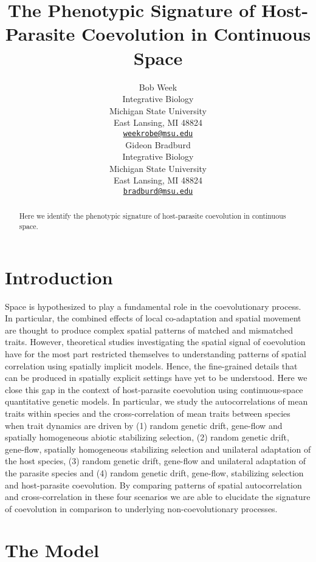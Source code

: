 \documentclass{article}
\title{The Phenotypic Signature of Host-Parasite Coevolution in Continuous
Space}
\author{
    Bob Week
   \\
    Integrative Biology \\
    Michigan State University \\
  East Lansing, MI 48824 \\
  \texttt{\href{mailto:weekrobe@msu.edu}{\nolinkurl{weekrobe@msu.edu}}} \\
   \And
    Gideon Bradburd
   \\
    Integrative Biology \\
    Michigan State University \\
  East Lansing, MI 48824 \\
  \texttt{\href{mailto:bradburd@msu.edu}{\nolinkurl{bradburd@msu.edu}}} \\
  }
\begin{document}
\maketitle

\def\tightlist{}


\begin{abstract}
Here we identify the phenotypic signature of host-parasite coevolution
in continuous space.
\end{abstract}


\hypertarget{introduction}{%
\section{Introduction}\label{introduction}}

Space is hypothesized to play a fundamental role in the coevolutionary
process. In particular, the combined effects of local co-adaptation and
spatial movement are thought to produce complex spatial patterns of
matched and mismatched traits. However, theoretical studies
investigating the spatial signal of coevolution have for the most part
restricted themselves to understanding patterns of spatial correlation
using spatially implicit models. Hence, the fine-grained details that
can be produced in spatially explicit settings have yet to be
understood. Here we close this gap in the context of host-parasite
coevolution using continuous-space quantitative genetic models. In
particular, we study the autocorrelations of mean traits within species
and the cross-correlation of mean traits between species when trait
dynamics are driven by (1) random genetic drift, gene-flow and spatially
homogeneous abiotic stabilizing selection, (2) random genetic drift,
gene-flow, spatially homogeneous stabilizing selection and unilateral
adaptation of the host species, (3) random genetic drift, gene-flow and
unilateral adaptation of the parasite species and (4) random genetic
drift, gene-flow, stabilizing selection and host-parasite coevolution.
By comparing patterns of spatial autocorrelation and cross-correlation
in these four scenarios we are able to elucidate the signature of
coevolution in comparison to underlying non-coevolutionary processes.

\hypertarget{the-model}{%
\section{The Model}\label{the-model}}
\end{document}
